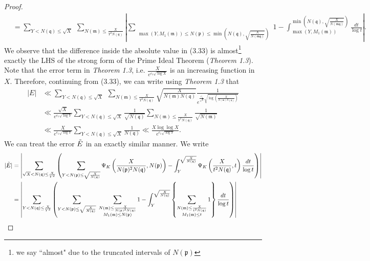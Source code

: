 \documentclass[12pt]{article}
\numberwithin{equation}{section}
\numberwithin{equation}{section}
\begin{document}
\begin{proof}
\begin{align}
    & =  \sum_{Y<N(\mathfrak{q})\leq \sqrt{X}} \;\sum_{N(\mathfrak{m}) \leq \frac{X}{Y^2N(\mathfrak{q})}}\left| \sum_{\substack{\max(Y,M_1(\mathfrak{m}))\leq N(\mathfrak{p})\leq  \min\left(N(\mathfrak{q}),\sqrt{\frac{X}{N(\mathfrak{mq})}}\right)            }       }      1    - \int_{\max(Y,M_1(\mathfrak{m}))}^{\min\left(N(\mathfrak{q}),\sqrt{\frac{X}{N(\mathfrak{mq})}}\right)}\frac{dt}{\log t}    \right|.
\end{align}
We observe that the difference inside the absolute value in (3.33) is almost\footnote[9]{we say ``almost" due to the truncated intervals of $N(\mathfrak{p})$} exactly the LHS of the strong form of the Prime Ideal Theorem (\textit{Theorem 1.3}). Note that the error term in \textit{Theorem 1.3}, i.e. $\frac{X}{e^{c_1\sqrt{\log X}}}$ is an increasing function in $X$. Therefore, continuing from (3.33), we can write using \textit{Theorem 1.3} that
\begin{align}
    |E| &\ll \sum_{Y<N(\mathfrak{q})\leq \sqrt{X}} \;\sum_{N(\mathfrak{m}) \leq \frac{X}{Y^2N(\mathfrak{q})}} \sqrt{\frac{X}{N(\mathfrak{m})N(\mathfrak{q})}}\frac{1}{e^{\frac{c_1}{\sqrt{2}}\sqrt{\log\left(\frac{X}{N(\mathfrak{m})N(\mathfrak{q})}\right)}}}\nonumber \\
    &\ll \frac{\sqrt{X}}{e^{c_1\sqrt{\log Y}}} \sum_{Y<N(\mathfrak{q})\leq \sqrt{X}}\frac{1}{\sqrt{N(\mathfrak{q})}} \sum_{N(\mathfrak{m}) \leq \frac{X}{Y^2N(\mathfrak{q})}} \frac{1}{\sqrt{N(\mathfrak{m})}} \nonumber \\
    &\ll \frac{X}{e^{c_1\sqrt{\log Y}}}\sum_{Y < N(\mathfrak{q})\leq \sqrt{X}} \frac{1}{N(\mathfrak{q})} \ll \frac{X\log \log X}{e^{c_1\sqrt{\log Y}}} .
\end{align}
We can treat the error $\Tilde{E}$ in an exactly similar manner. We write
\begin{align}
     |\Tilde{E}| &= \left| \sum_{\sqrt{X}<N(\mathfrak{q})\leq\frac{X}{Y^2}}\left(\sum_{\substack{Y<N(\mathfrak{p})\leq \sqrt{\frac{X}{N(\mathfrak{q})} } }} \Psi_K\left(\frac{X}{N(\mathfrak{p})^2N(\mathfrak{q})},N(\mathfrak{p})\right) - \int_Y^{\sqrt{\frac{X}{N(\mathfrak{q})} } } \Psi_K\left(\frac{X}{t^2N(\mathfrak{q})},t\right)\frac{dt}{\log t}\right)\right|  \nonumber \\
    &= \left| \sum_{Y<N(\mathfrak{q})\leq \frac{X}{Y^2}}\left(\sum_{\substack{Y<N(\mathfrak{p})\leq \sqrt{\frac{X}{N(\mathfrak{q})} } }}\; \sum_{\substack{N(\mathfrak{m}) \leq \frac{X}{N(\mathfrak{p})^2N(\mathfrak{q})} \\ M_1(\mathfrak{m})\leq N(\mathfrak{p})}} 1- \int_Y^{\sqrt{\frac{X}{N(\mathfrak{q})} } } \left\{\sum_{\substack{N(\mathfrak{m}) \leq \frac{X}{t^2N(\mathfrak{q})} \\ M_1(\mathfrak{m})\leq t}}1\right\}\frac{dt}{\log t}\right)\right| \nonumber \\

\end{align}
\end{proof}
\end{document}
